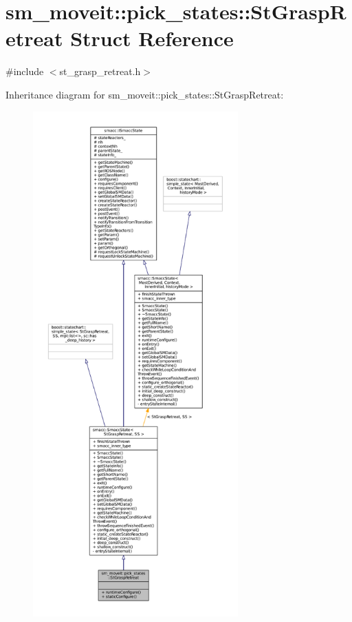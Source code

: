 \hypertarget{structsm__moveit_1_1pick__states_1_1StGraspRetreat}{}\section{sm\+\_\+moveit\+:\+:pick\+\_\+states\+:\+:St\+Grasp\+Retreat Struct Reference}
\label{structsm__moveit_1_1pick__states_1_1StGraspRetreat}


{\ttfamily \#include $<$st\+\_\+grasp\+\_\+retreat.\+h$>$}



Inheritance diagram for sm\+\_\+moveit\+:\+:pick\+\_\+states\+:\+:St\+Grasp\+Retreat\+:
\nopagebreak
\begin{figure}[H]
\begin{center}
\leavevmode
\includegraphics[height=550pt]{structsm__moveit_1_1pick__states_1_1StGraspRetreat__inherit__graph}
\end{center}
\end{figure}



